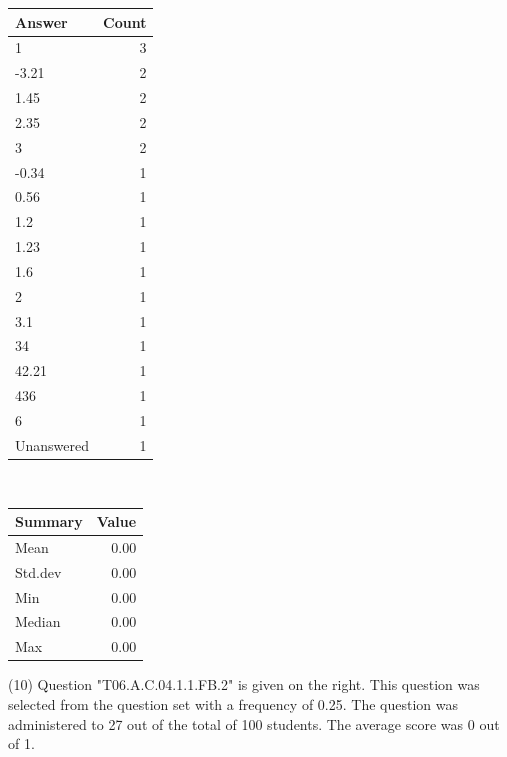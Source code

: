 \documentclass[12pt,nohyper]{tufte-handout}\usepackage[]{graphicx}\usepackage[]{color}
\begin{document}
\begin{center}%
\begin{tabular}{lr}
  \hline
Answer & Count \\ 
  \hline
1 &   3 \\ 
  -3.21 &   2 \\ 
  1.45 &   2 \\ 
  2.35 &   2 \\ 
  3 &   2 \\ 
  -0.34 &   1 \\ 
  0.56 &   1 \\ 
  1.2 &   1 \\ 
  1.23 &   1 \\ 
  1.6 &   1 \\ 
  2 &   1 \\ 
  3.1 &   1 \\ 
  34 &   1 \\ 
  42.21 &   1 \\ 
  436 &   1 \\ 
  6 &   1 \\ 
  Unanswered &   1 \\ 
   \hline
\end{tabular}
~~~~~~~~%
\begin{tabular}{lr}
  \hline
Summary & Value \\ 
  \hline
Mean & 0.00 \\ 
  Std.dev & 0.00 \\ 
  Min & 0.00 \\ 
  Median & 0.00 \\ 
  Max & 0.00 \\ 
   \hline
\end{tabular}
\end{center}\newpage{} (10) Question "T06.A.C.04.1.1.FB.2" is given on the right. This question was selected from the question set with a frequency of 0.25. The question was administered to 27 out of the total of 100 students. The average score was 0 out of 1.
\end{document}
